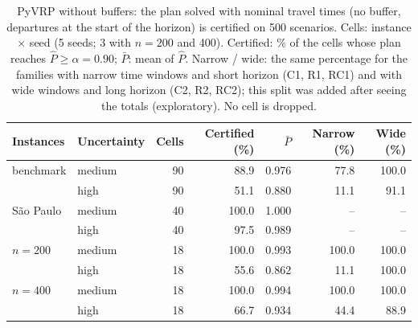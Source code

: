\begin{table}[htbp]
\centering
\caption{PyVRP without buffers: the plan solved with nominal travel times (no buffer, departures at the start of the horizon) is certified on 500 scenarios. Cells: instance $\times$ seed (5 seeds; 3 with $n=200$ and 400). Certified: \% of the cells whose plan reaches $\hat P\ge\alpha=0.90$; $\bar P$: mean of $\hat P$. Narrow / wide: the same percentage for the families with narrow time windows and short horizon (C1, R1, RC1) and with wide windows and long horizon (C2, R2, RC2); this split was added after seeing the totals (exploratory). No cell is dropped.}
\label{tab:pyvrp-nominal}
\small\setlength{\tabcolsep}{4pt}
\begin{tabular}{@{}l l r r r r r@{}}
\toprule
Instances & Uncertainty & Cells & Certified (\%) & $\bar P$ & Narrow (\%) & Wide (\%) \\
\midrule
benchmark & medium & 90 & 88.9 & 0.976 & 77.8 & 100.0 \\
 & high & 90 & 51.1 & 0.880 & 11.1 & 91.1 \\
\midrule
S\~ao Paulo & medium & 40 & 100.0 & 1.000 & -- & -- \\
 & high & 40 & 97.5 & 0.989 & -- & -- \\
\midrule
$n=200$ & medium & 18 & 100.0 & 0.993 & 100.0 & 100.0 \\
 & high & 18 & 55.6 & 0.862 & 11.1 & 100.0 \\
\midrule
$n=400$ & medium & 18 & 100.0 & 0.994 & 100.0 & 100.0 \\
 & high & 18 & 66.7 & 0.934 & 44.4 & 88.9 \\
\bottomrule
\end{tabular}
\end{table}
